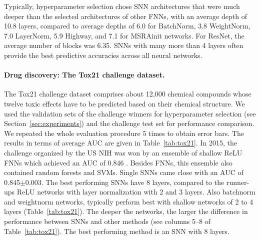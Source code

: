 \documentclass{article}
\begin{document}
Typically, hyperparameter selection chose SNN architectures that were
much deeper than the selected architectures of other FNNs, with an average depth of 10.8 layers, 
compared to average depths of 6.0 for BatchNorm, 3.8 WeightNorm, 7.0 LayerNorm, 5.9 Highway,  
and 7.1 for MSRAinit networks. For ResNet, the average number of blocks was 6.35. 
SNNs with many more than 4 layers often provide the best predictive accuracies across all neural networks. 
























\paragraph{Drug discovery: The Tox21 challenge dataset.} 
The Tox21 challenge dataset comprises about 12,000 chemical compounds
whose twelve toxic effects have to be predicted based on their chemical structure. 
We used the validation sets 
of the challenge winners for hyperparameter selection (see Section~\ref{sec:experiments}) and 
the challenge test set for performance comparison. 
We repeated the whole evaluation procedure 5 times 
to obtain error bars. 
The results in terms of average AUC are given in Table~\ref{tab:tox21}.
In 2015, the challenge organized by the US NIH 
was won by an ensemble of shallow ReLU FNNs which achieved an AUC of 0.846 \citep{bib:Mayr2016}.
Besides FNNs, this ensemble also contained random forests and SVMs.
Single SNNs came close with an AUC of 0.845$\pm$0.003.
The best performing SNNs have 8 layers, compared to the runner-ups ReLU networks with layer normalization with 2 and 3 layers. 
Also batchnorm and weightnorm networks, typically perform best with shallow
networks of 2 to 4 layers (Table~\ref{tab:tox21}). The deeper the networks, the 
larger the difference in performance between SNNs and other methods (see columns 5--8 of Table~\ref{tab:tox21}).
The best performing method is an SNN with 8 layers.
\end{document}
